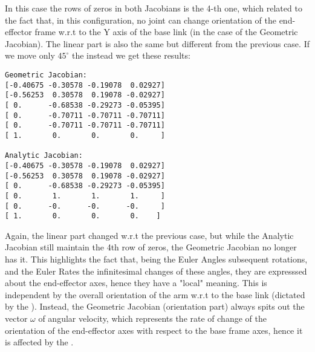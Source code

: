 \documentclass[11pt]{article}
\begin{document}
In this case the rows of zeros in both Jacobians is the 4-th one, which related to the fact that, in this configuration, 
no joint can change orientation of the end-effector frame w.r.t to the Y axis of the base link (in the case of the  Geometric Jacobian). The linear part is also the same but different from the previous case.
If we move only $45^\circ$ the  instead we get these results:


\begin{verbatim}
Geometric Jacobian:
[-0.40675 -0.30578 -0.19078  0.02927]
[-0.56253  0.30578  0.19078 -0.02927]
[ 0.      -0.68538 -0.29273 -0.05395]
[ 0.      -0.70711 -0.70711 -0.70711]
[ 0.      -0.70711 -0.70711 -0.70711]
[ 1.       0.       0.       0.     ]

Analytic Jacobian:
[-0.40675 -0.30578 -0.19078  0.02927]
[-0.56253  0.30578  0.19078 -0.02927]
[ 0.      -0.68538 -0.29273 -0.05395]
[ 0.       1.       1.       1.     ]
[ 0.      -0.      -0.      -0.     ]
[ 1.       0.       0.       0.    ]
\end{verbatim}

Again, the linear part changed w.r.t the previous case, but while the Analytic Jacobian still maintain the 4th row of zeros, the Geometric Jacobian no longer has it. 
This highlights the fact that, being the Euler Angles subsequent rotations, and the Euler Rates the infinitesimal changes of these angles, they are expresssed  about the end-effector axes,
hence they have a "local" meaning. This is independent by the overall orientation of the arm w.r.t to the base link (dictated by the  ). 
Instead, the  Geometric Jacobian (orientation part) always spits out the vector $\omega$ of angular velocity, which represents the rate of change of the orientation of the end-effector axes with respect to the base frame axes, hence it is affected by the  .
\end{document}
